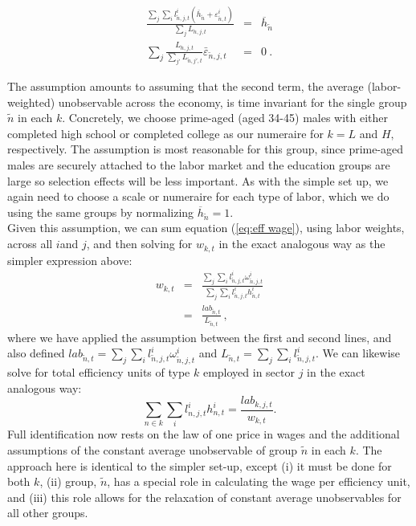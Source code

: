 \documentclass[10pt]{article}
\begin{document}
\begin{eqnarray*}
\frac{\sum_{j}\sum_{i}l_{\tilde{n},j,t}^{i}\left(\overline{h}_{\tilde{n}}+\varepsilon_{\tilde{n},t}^{i}\right)}{\sum_{j}L_{\tilde{n},j,t}} & = & \overline{h}_{\tilde{n}}\\
\sum_{j}\frac{L_{\tilde{n},j,t}}{\sum_{j'}L_{\tilde{n},j',t}}\bar{\varepsilon}_{\tilde{n},j,t} & = & 0 \ .
\end{eqnarray*}

The assumption amounts to assuming that the second term, the average (labor-weighted) unobservable across the economy, is time invariant for the single group $\tilde{n}$ in each $k$. Concretely, we choose prime-aged (aged 34-45) males with either completed high school or completed college as our numeraire for $k=L$ and $H,$ respectively. The assumption is most reasonable for this group, since prime-aged males are securely attached to the labor market and the education groups are large so selection effects will be less important. As with
the simple set up, we again need to choose a scale or numeraire for each type of labor, which we do using the same groups by normalizing $\overline{h}_{\tilde{n}}=1$. \\

Given this assumption, we can sum equation (\ref{eq:eff wage}), using labor weights, across all $i$and $j$, and then solving for $w_{k,t}$ in the exact analogous way as the simpler expression above:
\begin{eqnarray*}
w_{k,t} & = & \frac{\sum_{j}\sum_{i}l_{\tilde{n},j,t}^{i}\omega_{\tilde{n},j,t}^{i}}{\sum_{j}\sum_{i}l_{\tilde{n},j,t}^{i}h_{\tilde{n},t}^{i}}\\
 & = & \frac{lab_{\tilde{n},t}}{L_{\tilde{n},t}} \ ,
\end{eqnarray*}
where we have applied the assumption between the first and second lines, and also defined $lab_{\tilde{n},t}=\sum_{j}\sum_{i}l_{\tilde{n},j,t}^{i}\omega_{\tilde{n},j,t}^{i}$ and $L_{\tilde{n},t}=\sum_{j}\sum_{i}l_{\tilde{n},j,t}^{i}$. We can likewise solve for total efficiency units of type $k$ employed in sector $j$ in the exact analogous way:
$$\sum_{n\in k}\sum_{i}l_{n,j,t}^{i}h_{n,t}^{i}=\frac{lab_{k,j,t}}{w_{k,t}}.$$
Full identification now rests on the law of one price in wages and the additional assumptions of the constant average unobservable of group $\tilde{n}$ in each $k.$ The approach here is identical to the simpler set-up, except (i) it must be done for both $k$, (ii) group, $\tilde{n}$, has a special role in calculating the wage per  efficiency unit, and (iii) this role allows for the relaxation of constant average unobservables for all other groups. 
\end{document}

